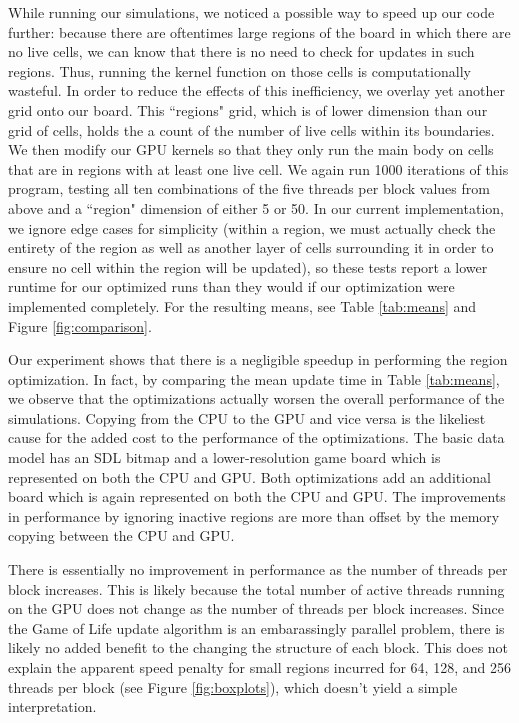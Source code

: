 \documentclass[onecolumn,12pt]{IEEEtran}
\begin{document}
  While running our simulations, we noticed a possible way to speed up our code
  further: because there are oftentimes large regions of the board in which there
  are no live cells, we can know that there is no need to check for updates in
  such regions. Thus, running the kernel function on those cells is
  computationally wasteful. In order to reduce the effects of this inefficiency,
  we overlay yet another grid onto our board. This ``regions" grid, which is of
  lower dimension than our grid of cells, holds the a count of the number of live
  cells within its boundaries. We then modify our GPU kernels so that they only
  run the main body on cells that are in regions with at least one live cell. We
  again run 1000 iterations of this program, testing all ten combinations of the
  five threads per block values from above and a ``region" dimension of either 5
  or 50. In our current implementation, we ignore edge cases for simplicity
  (within a region, we must actually check the entirety of the region as well as
  another layer of cells surrounding it in order to ensure no cell within the
  region will be updated), so these tests report a lower runtime for our
  optimized runs than they would if our optimization were implemented completely.
  For the resulting means, see Table \ref{tab:means} and Figure \ref{fig:comparison}.
  
  Our experiment shows that there is a negligible speedup in performing the
  region optimization. In fact, by comparing the mean update time in Table
  \ref{tab:means}, we observe that the optimizations actually worsen the overall
  performance of the simulations. Copying from the CPU to the GPU and vice versa
  is the likeliest cause for the added cost to the performance of the
  optimizations. The basic data model has an SDL bitmap and a lower-resolution
  game board which is represented on both the CPU and GPU.  Both optimizations
  add an additional board which is again represented on both the CPU and GPU. 
  The improvements in performance by ignoring inactive regions are more than 
  offset by the memory copying between the CPU and GPU.

  There is essentially no improvement in performance as the number of threads per
  block increases. This is likely because the total number of active threads
  running on the GPU does not change as the number of threads per block
  increases. Since the Game of Life update algorithm is an embarassingly parallel
  problem, there is likely no added benefit to the changing the structure of each
  block. This does not explain the apparent speed penalty for small regions
  incurred for 64, 128, and 256 threads per block (see Figure
  \ref{fig:boxplots}), which doesn't yield a simple interpretation.
  
\end{document}
